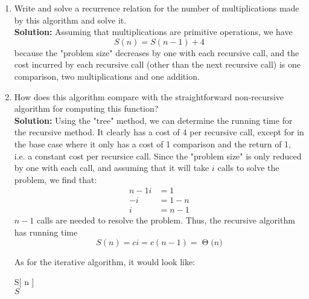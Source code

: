 \documentclass[11pts]{article}
\newcommand{\BigTheta}[1]{\ensuremath{\operatorname{\Theta}\bigl(#1\bigr)}}
\begin{document}
\begin{enumerate}
  \begin{enumerate}
  \item Write and solve a recurrence relation for the number of
  multiplications made by this algorithm and solve it. \\

  \textbf{Solution:} Assuming that multiplications are primitive operations,
  we have \[ S(n) = S(n - 1) + 4 \] because the "problem size" decreases
  by one with each recursive call, and the cost incurred by each
  recursive call (other than the next recursive call) is one comparison,
  two multiplications and one addition. \\

  \item How does this algorithm compare with the straightforward
  non-recursive algorithm for computing this function? \\

  \textbf{Solution:} Using the "tree" method, we can determine the running
  time for the recursive method. It clearly has a cost of 4 per recursive
  call, except for in the base case where it only has a cost of 1 comparison
  and the return of 1, i.e. a constant cost per recursice call. Since
  the "problem size" is only reduced by one with each call, and assuming that
  it will take $i$ calls to solve the problem, we find that:
  \begin{align*}
    n - 1i &= 1 \\
    -i     &= 1 - n \\
    i      &= n - 1 
  \end{align*}
  $n - 1$ calls are needed to resolve the problem. Thus, the recursive
  algorithm has running time
  \[ S(n) = ci = c(n - 1) = \BigTheta{n} \]

  As for the iterative algorithm, it would look like:
  \begin{algorithm}{S}[ n ]{
     }
   \\
    \qrof
  \qreturn $ S $
  \end{algorithm}


\end{enumerate}
\end{enumerate}
\end{document}
